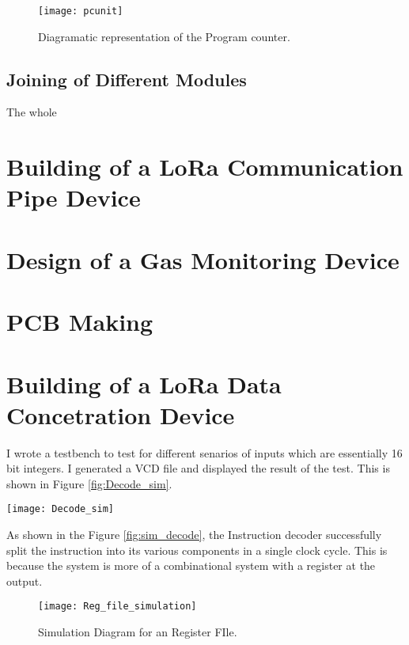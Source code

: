 \begin{figure}[p]
\texttt{[image: pcunit]}
\centering
\caption{Diagramatic representation of the Program counter.}
\centering
\label{fig:pcunit}
\end{figure}

\subsection{Joining of Different Modules}
The whole


\section{Building of a LoRa Communication Pipe Device} 



\section{Design of a Gas Monitoring Device} 



\section{PCB Making} 

\section{Building of a LoRa Data Concetration Device}

I wrote a testbench to test for different senarios of inputs which are essentially 16 bit integers. I generated a VCD file and displayed the result of the test. This is shown in Figure \ref{fig:Decode_sim}.

\begin{sidewaysfigure}[p]
    \centering
    \texttt{[image: Decode\_sim]}
	\caption{Simulation Diagram for an Instruction Decoder.}
    \label{fig:sim_decode}
\end{sidewaysfigure}

As shown in the  Figure \ref{fig:sim_decode}, the Instruction decoder successfully split the instruction into its various components in a single clock cycle. This is because the system is more of a combinational system with a register at the output.




\begin{figure}[p]
    \centering
    \texttt{[image: Reg\_file\_simulation]}
	\caption{Simulation Diagram for an Register FIle.}
    \label{fig:reg_sim}
\end{figure}

